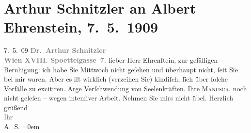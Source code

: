 

         
         \renewcommand{\erwaehntePersonen}{Personen: Albert Ehrenstein}
         \renewcommand{\erwaehnteOrte}{Orte: Edmund-Weiß-Gasse, Wien}
         \renewcommand{\erwaehnteWerke}{Werke: Apaturien, Tod des Zehir eddin Muhammed Baber, Tubutsch}
               \section[Arthur Schnitzler an Albert Ehrenstein, 7. 5. 1909]{ Arthur Schnitzler an Albert Ehrenstein, 7. 5. 1909}\nopagebreak{}\rehead{ }\begin{ledgroupsized}[t]{13cm}\normalsize\beginnumbering \toendnotes[C]{\smallbreak\pagebreak[2]} 
\toendnotes[C]{\smallbreak}\pstart
           \raggedleft{}{\pb}7. 5. 09\pend
           \pstart
           \textcolor{gray}{\textbf{Dr. Arthur Schnitzler}}{\\}\textcolor{gray}{\textbf{Wien XVIII. Spoettelgasse 7.}}\pend
           \pstart{}lieber Herr Ehrenſtein,\pend\pstart
           zur gefälligen Beruhigung: ich habe Sie Mittwoch nicht geſehen und
               überhaupt nicht, ſeit Sie bei mir waren.\pend
           \pstart
           Aber es iſt wirklich (verzeihen Sie) kindiſch, ſich über ſolche Vorfälle zu
               excitiren. Arge Verſchwendung von Seelenkräften. Ihre \textsc{Manuscr.} noch nicht geleſen – {\pb}wegen intenſiver Arbeit. Nehmen Sie
               mirs nicht übel.\pend
           \pstart
           Herzlich grüßend{\\[\baselineskip]}Ihr{\\[\baselineskip]}\spacefill\mbox{A. S.}\pend
           \leftskip=0em{}
         
         \endnumbering{}\end{ledgroupsized}  \newcommand{\dateiname}{L01841}\newcommand{\titel}{Arthur Schnitzler an Albert Ehrenstein, 7. 5. 1909}\newcommand{\editorInnen}{Martin Anton Müller und Gerd-Hermann Susen}
      